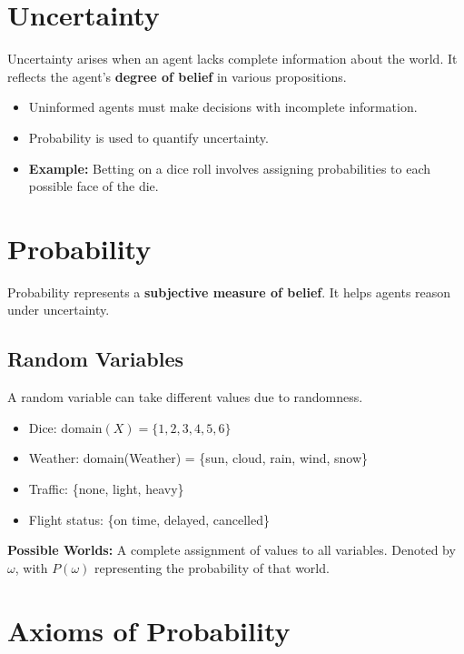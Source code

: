
\section{Uncertainty}

Uncertainty arises when an agent lacks complete information about the world. It reflects the agent’s \textbf{degree of belief} in various propositions.

\begin{itemize}
    \item Uninformed agents must make decisions with incomplete information.
    \item Probability is used to quantify uncertainty.
    \item \textbf{Example:} Betting on a dice roll involves assigning probabilities to each possible face of the die.
\end{itemize}

\section{Probability}

Probability represents a \textbf{subjective measure of belief}. It helps agents reason under uncertainty.

\subsection*{Random Variables}

A random variable can take different values due to randomness.

\begin{itemize}
    \item Dice: domain$(X) = \{1, 2, 3, 4, 5, 6\}$
    \item Weather: domain(Weather) = \{sun, cloud, rain, wind, snow\}
    \item Traffic: \{none, light, heavy\}
    \item Flight status: \{on time, delayed, cancelled\}
\end{itemize}

\textbf{Possible Worlds:} A complete assignment of values to all variables. Denoted by \( \omega \), with \( P(\omega) \) representing the probability of that world.

\section{Axioms of Probability}

